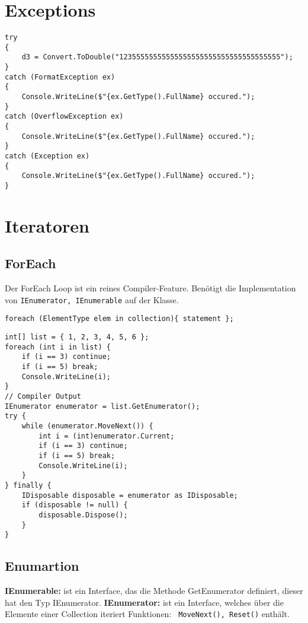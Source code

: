 \section{Exceptions}

\begin{lstlisting}
try
{
    d3 = Convert.ToDouble("12355555555555555555555555555555555555");
}
catch (FormatException ex)
{
    Console.WriteLine($"{ex.GetType().FullName} occured.");
}
catch (OverflowException ex)
{
    Console.WriteLine($"{ex.GetType().FullName} occured.");
}
catch (Exception ex)
{
    Console.WriteLine($"{ex.GetType().FullName} occured.");
}
\end{lstlisting}


\section{Iteratoren}

\subsection{ForEach}
Der ForEach Loop ist ein reines Compiler-Feature. Benötigt die Implementation von \lstinline{IEnumerator, IEnumerable} auf der Klasse.
\begin{lstlisting}
foreach (ElementType elem in collection){ statement };
\end{lstlisting}

\begin{lstlisting}
int[] list = { 1, 2, 3, 4, 5, 6 }; 
foreach (int i in list) {
	if (i == 3) continue; 
	if (i == 5) break; 
	Console.WriteLine(i);
}
// Compiler Output
IEnumerator enumerator = list.GetEnumerator(); 
try {
	while (enumerator.MoveNext()) {
		int i = (int)enumerator.Current; 
		if (i == 3) continue; 
		if (i == 5) break; 
		Console.WriteLine(i);
	}
} finally {
	IDisposable disposable = enumerator as IDisposable;
	if (disposable != null) {
		disposable.Dispose();
	}
}
\end{lstlisting}


\subsection{Enumartion}
\textbf{IEnumerable:} ist ein Interface, das die Methode GetEnumerator definiert, dieser hat den Typ IEnumerator.
\textbf{IEnumerator:} ist ein Interface, welches über die Elemente einer Collection iteriert Funktionen: \lstinline{ MoveNext(), Reset()} enthält.

